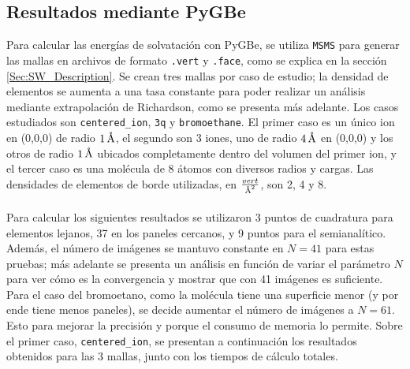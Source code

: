 \documentclass[12pt, oneside, numbers, spanish]{ezthesis}
\numberwithin{equation}{section}
\newcommand{\angstrom}{\text{\normalfont\AA}}
\begin{document}
\subsection{Resultados mediante PyGBe}\label{resultados_pygbe}
Para calcular las energías de solvatación con PyGBe, se utiliza \texttt{MSMS} para generar las mallas en archivos de formato \texttt{.vert} y \texttt{.face}, como se explica en la sección \ref{Sec:SW_Description}. Se crean tres mallas por caso de estudio; la densidad de elementos se aumenta a una tasa constante para poder realizar un análisis mediante extrapolación de Richardson, como se presenta más adelante. Los casos estudiados son \texttt{centered\_ion}, \texttt{3q} y \texttt{bromoethane}. El primer caso es un único ion en (0,0,0) de radio $1\,\angstrom$, el segundo son 3 iones, uno de radio $4\,\angstrom$ en (0,0,0) y los otros de radio $1\,\angstrom$ ubicados completamente dentro del volumen del primer ion, y el tercer caso es una molécula de 8 átomos con diversos radios y cargas. Las densidades de elementos de borde utilizadas, en $\frac{vert}{\angstrom^2}$, son 2, 4 y 8.\\\\
Para calcular los siguientes resultados se utilizaron 3 puntos de cuadratura para elementos lejanos, 37 en los paneles cercanos, y 9 puntos para el semianalítico. Además, el número de imágenes se mantuvo constante en $N=41$ para estas pruebas; más adelante se presenta un análisis en función de variar el parámetro $N$ para ver cómo es la convergencia y mostrar que con 41 imágenes es suficiente. Para el caso del bromoetano, como la molécula tiene una superficie menor (y por ende tiene menos paneles), se decide aumentar el número de imágenes a $N=61$. Esto para mejorar la precisión y porque el consumo de memoria lo permite.
Sobre el primer caso, \texttt{centered\_ion}, se presentan a continuación los resultados obtenidos para las 3 mallas, junto con los tiempos de cálculo totales.
\end{document}
